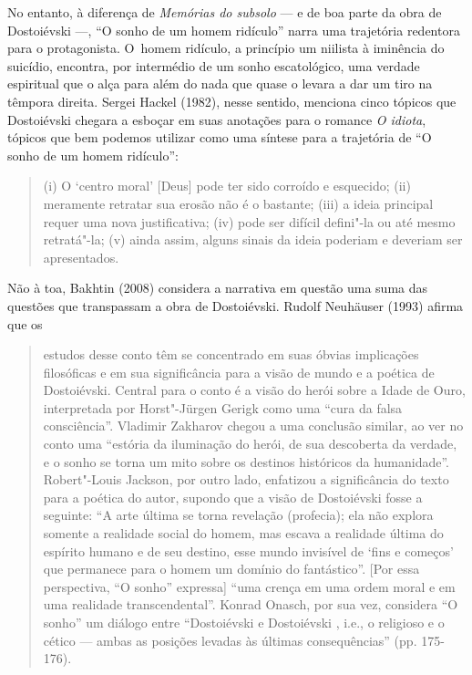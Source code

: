 No entanto, à diferença de \emph{Memórias do subsolo} --- e de boa parte
da obra de Dostoiévski ---, ``O sonho de um homem ridículo'' narra uma
trajetória redentora para o protagonista. O~homem ridículo, a princípio
um niilista à iminência do suicídio, encontra, por intermédio de um
sonho escatológico, uma verdade espiritual que o alça para além do nada
que quase o levara a dar um tiro na têmpora direita. Sergei Hackel
(1982), nesse sentido, menciona cinco tópicos que Dostoiévski chegara a
esboçar em suas anotações para o romance \emph{O idiota}, tópicos que
bem podemos utilizar como uma síntese para a trajetória de ``O sonho de
um homem ridículo'':

\begin{quote}
(i) O `centro moral' {[}Deus{]} pode ter sido corroído e esquecido; (ii)
meramente retratar sua erosão não é o bastante; (iii) a ideia principal
requer uma nova justificativa; (iv) pode ser difícil defini"-la ou até
mesmo retratá"-la; (v) ainda assim, alguns sinais da ideia poderiam e
deveriam ser apresentados.
\end{quote}

Não à toa, Bakhtin (2008) considera a narrativa em questão uma suma das
questões que transpassam a obra de Dostoiévski. Rudolf Neuhäuser (1993)
afirma que os

\begin{quote}
estudos desse conto têm se concentrado em suas óbvias implicações
filosóficas e em sua significância para a visão de mundo e a poética de
Dostoiévski. Central para o conto é a visão do herói sobre a Idade de
Ouro, interpretada por Horst"-Jürgen Gerigk como uma ``cura da falsa
consciência''. Vladimir Zakharov chegou a uma conclusão similar, ao ver
no conto uma ``estória da iluminação do herói, de sua descoberta da
verdade, e o sonho se torna um mito sobre os destinos históricos da
humanidade''. Robert"-Louis Jackson, por outro lado, enfatizou a
significância do texto para a poética do autor, supondo que a visão de
Dostoiévski fosse a seguinte: ``A arte última se torna revelação
(profecia); ela não explora somente a realidade social do homem, mas
escava a realidade última do espírito humano e de seu destino, esse
mundo invisível de `fins e começos' que permanece para o homem um
domínio do fantástico''. {[}Por essa perspectiva, ``O sonho''
expressa{]} ``uma crença em uma ordem moral e em uma realidade
transcendental''. Konrad Onasch, por sua vez, considera ``O sonho'' um
diálogo entre ``Dostoiévski  e Dostoiévski , i.e., o religioso e o
cético --- ambas as posições levadas às últimas consequências'' (pp.
175-176).
\end{quote}

